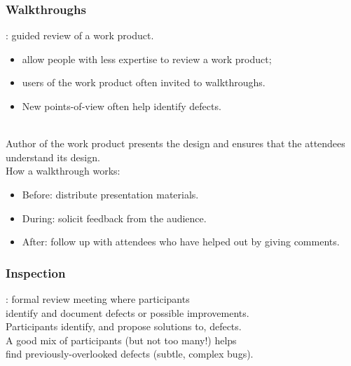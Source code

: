 \begin{frame}
\frametitle{Walkthroughs}

\begin{changemargin}{1cm}
: guided review of a work
product.

\begin{itemize}
\item allow people with less expertise to review a work
product;
\item users of the work product often invited to
walkthroughs.  
\item New points-of-view often help identify defects.
\end{itemize}~\\


Author of the work product presents the design and
ensures that the attendees understand its design.\\[1em]

How a walkthrough works:
\begin{itemize}
\item Before: distribute presentation materials.
\item During: solicit feedback from the audience.
\item After: follow up with attendees who have helped out by giving comments.
\end{itemize}
\end{changemargin}

\end{frame}

\begin{frame}
\frametitle{Inspection}

\begin{changemargin}{1.5cm}
: formal review meeting where participants\\
identify and document defects or possible improvements. \\[1em]

Participants identify, and propose
solutions to, defects. \\[1em]

A good mix  of participants (but not too many!) helps\\
find previously-overlooked defects (subtle, complex bugs).

\end{changemargin}

\end{frame}

